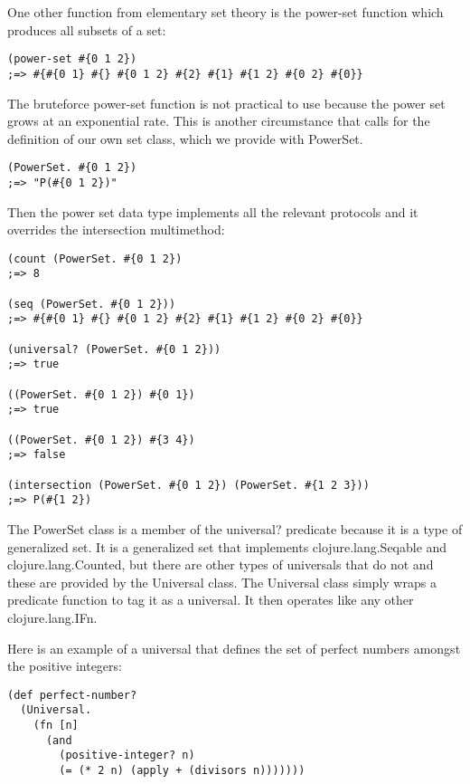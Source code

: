 \documentclass[a4paper,11pt]{report}
\begin{document}
One other function from elementary set theory is the power-set function which produces all subsets of a set:

\lstset {language=Lisp}
\begin{lstlisting}
(power-set #{0 1 2})
;=> #{#{0 1} #{} #{0 1 2} #{2} #{1} #{1 2} #{0 2} #{0}}
\end{lstlisting}

The bruteforce power-set function is not practical to use because the power set grows at an exponential rate. This is another circumstance that calls for the definition of our own set class, which we provide with PowerSet.

\lstset {language=Lisp}
\begin{lstlisting}
(PowerSet. #{0 1 2})
;=> "P(#{0 1 2})"
\end{lstlisting}

Then the power set data type implements all the relevant protocols and it overrides the intersection multimethod:

\lstset {language=Lisp}
\begin{lstlisting}
(count (PowerSet. #{0 1 2})
;=> 8

(seq (PowerSet. #{0 1 2}))
;=> #{#{0 1} #{} #{0 1 2} #{2} #{1} #{1 2} #{0 2} #{0}}

(universal? (PowerSet. #{0 1 2}))
;=> true

((PowerSet. #{0 1 2}) #{0 1})
;=> true

((PowerSet. #{0 1 2}) #{3 4})
;=> false

(intersection (PowerSet. #{0 1 2}) (PowerSet. #{1 2 3}))
;=> P(#{1 2})
\end{lstlisting}

The PowerSet class is a member of the universal? predicate because it is a type of generalized set. It is a generalized set that implements clojure.lang.Seqable and clojure.lang.Counted, but there are other types of universals that do not and these are provided by the Universal class. The Universal class simply wraps a predicate function to tag it as a universal. It then operates like any other clojure.lang.IFn. 
\newpage 

Here is an example of a universal that defines the set of perfect numbers amongst the positive integers:

\lstset {language=Lisp}
\begin{lstlisting}
(def perfect-number? 
  (Universal. 
    (fn [n] 
      (and 
        (positive-integer? n)
        (= (* 2 n) (apply + (divisors n)))))))
\end{lstlisting}
\end{document}
